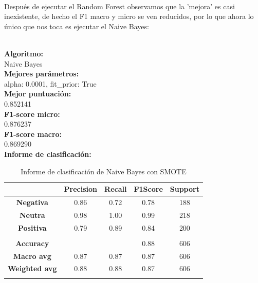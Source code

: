 \documentclass{report}
\begin{document}
{                \paragraph*{}{
                Después de ejecutar el Random Forest observamos que la 'mejora' es casi inexistente, de hecho el F1 macro y micro se ven reducidos, por lo que ahora lo único que nos toca es ejecutar el Naive Bayes:
                }
                     \\
                    \phantom{}
                    \\
                    \begin{center} {
                    \textbf{Algoritmo: }
                    \\
                    Naive Bayes
                    \\
                    \textbf{Mejores parámetros: }
                    \\
                    alpha: 0.0001, fit\_prior: True
                    \\
                    \textbf{Mejor puntuación: }
                    \\
                    0.852141
                    \\
                    \textbf{F1-score micro: }
                    \\
                    0.876237
                    \\
                    \textbf{F1-score macro: }
                    \\
                    0.869290
                    \\
                    \textbf{Informe de clasificación: }

                    \begin{longtable}{|c|c|c|c|c|}
                    \hline
                    & \textbf{Precision} & \textbf{Recall} & \textbf{F1Score} & \textbf{Support} \\
                    \hline
                    \textbf{Negativa} & 0.86 & 0.72 & 0.78 & 188 \\
                    \hline
                    \textbf{Neutra} & 0.98 & 1.00 & 0.99 & 218 \\
                    \hline
                    \textbf{Positiva} & 0.79 & 0.89 & 0.84 & 200 \\
                    \hline
                    & \phantom{} & \phantom{} & \phantom{} & \phantom{} \\
                    \hline
                    \textbf{Accuracy} &  &  & 0.88 & 606 \\
                    \hline
                    \textbf{Macro avg} & 0.87 & 0.87 & 0.87 & 606 \\
                    \hline
                    \textbf{Weighted avg} & 0.88 & 0.88 & 0.87 & 606 \\
                    \hline
                    \caption{Informe de clasificación de Naive Bayes con SMOTE}
                    \end{longtable}
            
}
\end{center}}
\end{document}
